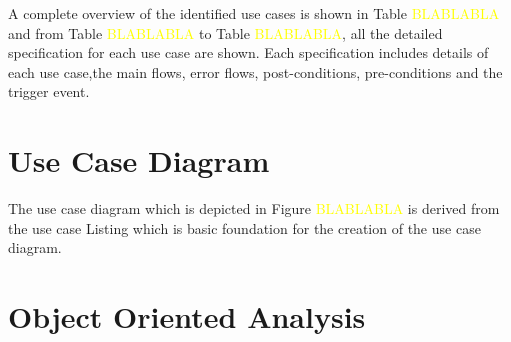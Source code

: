 A complete overview of the identified use cases is shown in  Table \textcolor{yellow}{BLABLABLA} and from Table \textcolor{yellow}{BLABLABLA} to Table \textcolor{yellow}{BLABLABLA}, all the detailed specification for each use case are shown. Each specification includes details of each use case,the main flows, error flows, post-conditions, pre-conditions and the trigger event.



\section{Use Case Diagram}
\label{sub:use_case_diagram}


The use case diagram which is depicted in Figure \textcolor{yellow}{BLABLABLA} is derived from the use case Listing which is basic foundation for the creation of the use case diagram.


\section{Object Oriented Analysis}
\label{sub:object_oriented_analysis}



\blindtext
\blindtext

